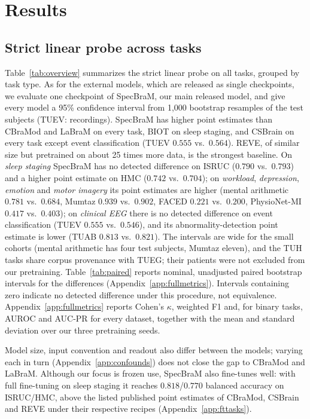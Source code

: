 \section{Results}\label{sec:results}



\subsection{Strict linear probe across tasks}\label{sec:lpfm}
Table~\ref{tab:overview} summarizes the strict linear probe on all tasks, grouped by task type.
As for the external models, which are released as single checkpoints, we evaluate one
checkpoint of SpecBraM, our main released model, and give every model a 95\% confidence
interval from 1{,}000 bootstrap resamples of the test subjects (TUEV: recordings). SpecBraM has
higher point estimates than CBraMod and LaBraM on every task, BIOT on sleep staging, and CSBrain
on every task except event classification (TUEV $0.555$ vs.\ $0.564$). REVE, of similar size but
pretrained on about 25 times more data, is the strongest baseline. On \emph{sleep staging}
SpecBraM has no detected difference on ISRUC ($0.790$ vs.\ $0.793$) and a higher point estimate on HMC ($0.742$ vs.\
$0.704$); on \emph{workload}, \emph{depression}, \emph{emotion} and \emph{motor imagery} its
point estimates are higher (mental arithmetic $0.781$ vs.\ $0.684$, Mumtaz $0.939$ vs.\ $0.902$, FACED $0.221$ vs.\
$0.200$, PhysioNet-MI $0.417$ vs.\ $0.403$); on \emph{clinical EEG} there is no detected
difference on event classification (TUEV $0.555$ vs.\ $0.546$), and its abnormality-detection point estimate is lower (TUAB $0.813$
vs.\ $0.821$). The intervals are wide for the small cohorts (mental arithmetic has four test
subjects, Mumtaz eleven), and the TUH tasks share corpus provenance with TUEG; their patients
were not excluded from our pretraining. Table~\ref{tab:paired} reports nominal, unadjusted
paired bootstrap intervals for the differences (Appendix~\ref{app:fullmetrics}). Intervals
containing zero indicate no detected difference under this procedure, not equivalence.
Appendix~\ref{app:fullmetrics} reports Cohen's $\kappa$, weighted F1 and, for
binary tasks, AUROC and AUC-PR for every dataset, together with the mean and standard deviation
over our three pretraining seeds.

Model size, input convention and readout also differ between the models; varying each in turn
(Appendix~\ref{app:confounds}) does not close the gap to CBraMod and LaBraM. Although our focus
is frozen use, SpecBraM also fine-tunes well: with full fine-tuning on sleep staging it reaches
$0.818$/$0.770$ balanced accuracy on ISRUC/HMC, above the listed published point estimates of
CBraMod, CSBrain and REVE under their respective recipes (Appendix~\ref{app:fttasks}).

